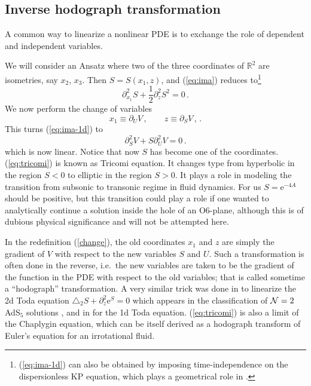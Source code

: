 \documentclass[12pt]{article}
\newcommand{\R}{\mathbb{R}}
\newcommand{\e}{\mathrm{e}}
\begin{document}
\subsection{Inverse hodograph transformation} \label{sub:hodo}

A common way to linearize a nonlinear PDE is to exchange the role of dependent and independent variables.

We will consider an Ansatz where two of the three coordinates of $\R^2$ are isometries, say $x_2$, $x_3$. Then $S=S(x_1,z)$, and (\ref{eq:ima}) reduces to\footnote{(\ref{eq:ima-1d}) can also be obtained by imposing time-independence on the dispersionless KP equation, which plays a geometrical role in \cite{dunajski-mason-tod}.}
\begin{equation}\label{eq:ima-1d}
\partial_{x_1}^2 S + \frac{1}{2}\partial_z^2 S^2 =0\,.
\end{equation}
We now perform the change of variables
\begin{equation}\label{change}
	x_1 \equiv \partial_U V\,, \qquad z \equiv  \partial_S V\,, \, .
\end{equation}
This turns (\ref{eq:ima-1d}) to
\begin{equation}\label{eq:tricomi}
	\partial_S^2 V + S \partial^2_U V = 0\,.
\end{equation}
which is now linear. Notice that now $S$ has become one of the coordinates. (\ref{eq:tricomi}) is known as Tricomi equation. It changes type from hyperbolic in the region $S<0$ to elliptic in the region $S>0$. It plays a role in modeling the transition from subsonic to transonic regime in fluid dynamics. For us $S=\e^{-4A}$ should be positive, but this transition could play a role if one wanted to analytically continue a solution inside the hole of an O6-plane, although this is of dubious physical significance and will not be attempted here.

In the redefinition (\ref{change}), the old coordinates $x_1$ and $z$ are simply the gradient of $V$ with respect to the new variables $S$ and $U$. Such a transformation is often done in the reverse, i.e.~the new variables are taken to be the gradient of the function in the PDE with respect to the old variables; that is called sometime a ``hodograph'' transformation. A very similar trick was done in \cite{lin-maldacena} to linearize the 2d Toda equation $\triangle_2 S+ \partial_z^2 \e^S=0$ which appears in the classification of ${\cal N}=2$ AdS$_5$ solutions \cite{lin-lunin-maldacena}, and in \cite{ward} for the 1d Toda equation. (\ref{eq:tricomi}) is also a limit of the Chaplygin equation, which can be itself derived as a hodograph transform of Euler's equation for an irrotational fluid. 
\end{document}
